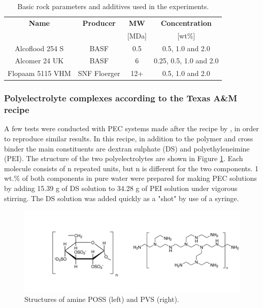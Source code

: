 \begin{table} 

\centering
\caption{Basic rock parameters and additives used in the experiments.}
\label{tab:crGels} %
\begin{tabular}{c c c c } 
\toprule
\textbf{Name} & \textbf{Producer} & \textbf{MW} & \textbf{Concentration} \\ 
&& [MDa] & [wt\%]   \\
\midrule 
Alcoflood 254 S     & BASF    & 0.5 & 0.5, 1.0 and 2.0\\
Alcomer 24 UK       & BASF    & 6 & 0.25, 0.5, 1.0 and 2.0  \\ 
Flopaam 5115 VHM    & SNF Floerger    & 12+ & 0.5, 1.0 and 2.0  \\ 

\bottomrule
\end{tabular}
\end{table}

\subsubsection{Polyelectrolyte complexes according to the Texas A\&M recipe}
A few tests were conducted with PEC systems made after the recipe by \cite{Johnson2010}, in order to reproduce similar results. In this recipe, in addition to the polymer and cross binder  the main constituents are dextran sulphate (DS)  and polyethyleneimine (PEI). The structure of the two polyelectrolytes are shown in Figure \ref{fig:pei}. Each molecule consists of n repeated units, but n is different for the two components. 1 wt.\% of both components in pure water were prepared for making PEC solutions by adding 15.39 g of DS solution to 34.28 g of PEI solution under vigorous stirring. The DS solution was added quickly as a "shot" by use of a syringe.

\begin{figure}[h]
    \centering
    \includegraphics[width=\textwidth]{img/fig/pei.png}
    \caption{Structures of amine POSS (left) and PVS (right).}
    \label{fig:pei}
\end{figure}
 
